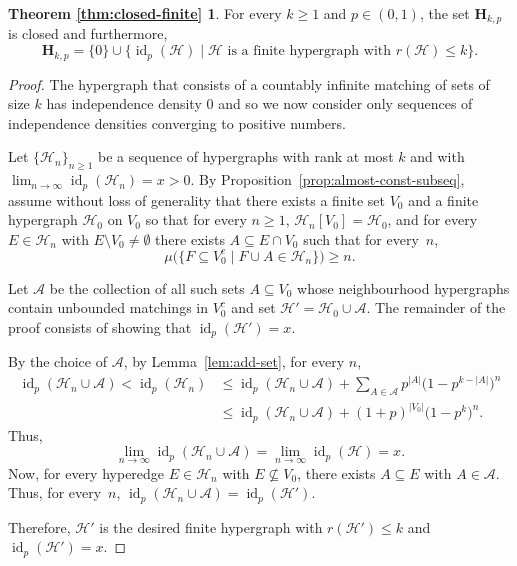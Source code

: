 \documentclass[11pt,reqno]{amsart}
\theoremstyle{definition}
\newtheorem*{mainthm}{Theorem \ref{thm:closed-finite}}
\begin{document}
\begin{mainthm}
For every $k \geq 1$ and $p \in (0,1)$, the set $\mathbf{H}_{k,p}$ is closed and furthermore,
\[
 \mathbf{H}_{k,p} = \{0\} \cup \{{\operatorname{id}}_p(\mathcal{H}) \mid \mathcal{H} \text{ is a finite hypergraph with } r(\mathcal{H}) \leq k\}.
\]
\end{mainthm}
\begin{proof}
The hypergraph that consists of a countably infinite matching of sets of size $k$ has independence density $0$ and so we now consider only sequences of independence densities converging to positive numbers.

Let $\{\mathcal{H}_n\}_{n \geq 1}$ be a sequence of hypergraphs with rank at most $k$ and with $\lim_{n \to \infty} {\operatorname{id}}_p(\mathcal{H}_n) = x > 0$. By Proposition~\ref{prop:almost-const-subseq}, assume without loss of generality that there exists a finite set $V_0$ and a finite hypergraph $\mathcal{H}_0$ on $V_0$ so that for every $n \geq 1$, $\mathcal{H}_n[V_0] = \mathcal{H}_0$, and for every $E \in \mathcal{H}_n$ with $E \setminus V_0 \neq \emptyset$ there exists $A \subseteq E \cap V_0$ such that for every~$n$,
\[
 \mu\big(\{F \subseteq V_0^c \mid F \cup A \in \mathcal{H}_n\}\big) \geq n.
\]

Let $\mathcal{A}$ be the collection of all such sets $A \subseteq V_0$ whose neighbourhood hypergraphs contain unbounded matchings in $V_0^c$ and set $\mathcal{H}' = \mathcal{H}_0 \cup \mathcal{A}$. The remainder of the proof consists of showing that ${\operatorname{id}}_p(\mathcal{H}') = x$.

By the choice of $\mathcal{A}$, by Lemma~\ref{lem:add-set}, for every $n$,
\begin{align*}
{\operatorname{id}}_p(\mathcal{H}_n \cup \mathcal{A})  < {\operatorname{id}}_p(\mathcal{H}_n) & \leq {\operatorname{id}}_p(\mathcal{H}_n \cup \mathcal{A}) + \sum_{A \in \mathcal{A}} p^{|A|}\big(1 -p^{k - |A|} \big)^n\\
	&\leq {\operatorname{id}}_p(\mathcal{H}_n \cup \mathcal{A}) + (1+p)^{|V_0|} \big(1 - p^k \big)^n.
\end{align*}
Thus,
\[
 \lim_{n \to \infty} {\operatorname{id}}_p(\mathcal{H}_n \cup \mathcal{A}) = \lim_{n \to \infty} {\operatorname{id}}_p(\mathcal{H}) = x.
\]
Now, for every hyperedge $E \in \mathcal{H}_n$ with $E \nsubseteq V_0$, there exists $A \subseteq E$ with $A \in \mathcal{A}$. Thus, for every~$n$, ${\operatorname{id}}_p(\mathcal{H}_n \cup \mathcal{A})  = {\operatorname{id}}_p(\mathcal{H}')$.

Therefore, $\mathcal{H}'$ is the desired finite hypergraph with $r(\mathcal{H}') \leq k$ and ${\operatorname{id}}_p(\mathcal{H}') = x$.
\end{proof}
\end{document}
